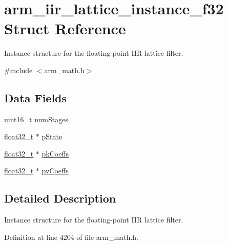 \hypertarget{structarm__iir__lattice__instance__f32}{\section{arm\-\_\-iir\-\_\-lattice\-\_\-instance\-\_\-f32 Struct Reference}
\label{structarm__iir__lattice__instance__f32}
}


Instance structure for the floating-\/point I\-I\-R lattice filter.  




{\ttfamily \#include $<$arm\-\_\-math.\-h$>$}

\subsection*{Data Fields}
\begin{DoxyCompactItemize}
\item 
\hyperlink{stdint_8h_a273cf69d639a59973b6019625df33e30}{uint16\-\_\-t} \hyperlink{structarm__iir__lattice__instance__f32_af8de449af5efe1f30be82f9ba35587ee}{num\-Stages}
\item 
\hyperlink{arm__math_8h_a4611b605e45ab401f02cab15c5e38715}{float32\-\_\-t} $\ast$ \hyperlink{structarm__iir__lattice__instance__f32_a30babe7815510219e6e3d28e6e4a5969}{p\-State}
\item 
\hyperlink{arm__math_8h_a4611b605e45ab401f02cab15c5e38715}{float32\-\_\-t} $\ast$ \hyperlink{structarm__iir__lattice__instance__f32_aa69fcdd3775e828d450ce1bbd978fa31}{pk\-Coeffs}
\item 
\hyperlink{arm__math_8h_a4611b605e45ab401f02cab15c5e38715}{float32\-\_\-t} $\ast$ \hyperlink{structarm__iir__lattice__instance__f32_afc7c8f577e6f27d097fe55f57e707f72}{pv\-Coeffs}
\end{DoxyCompactItemize}


\subsection{Detailed Description}
Instance structure for the floating-\/point I\-I\-R lattice filter. 

Definition at line 4204 of file arm\-\_\-math.\-h.



